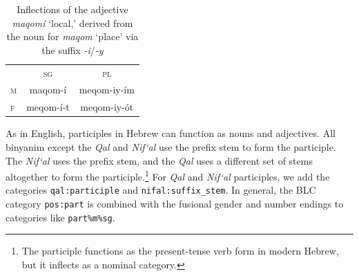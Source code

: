 {\begin{description}
\begin{table}[bt]
\centering
\small
\setlength{\extrarowheight}{8pt}
\begin{tabular}{lcc}
\toprule
& \textsc{sg} & \textsc{pl}  \\
\cmidrule(lr){2-3}
\textsc{m} & maqom-\'{i} &  meqom-iy-\'{i}m\\
\textsc{f} & meqom-\'{i}-t  & meqom-iy-\'{o}t  \\
\bottomrule
\end{tabular}
\label{tab:der-adjs}
\caption{Inflections of the adjective \textit{maqom\'{i}} `local,' derived from the noun for \textit{maqom} `place' via the suffix \textit{-i}/\textit{-y}}
\end{table}




\item[Participles.]
As in English, participles in Hebrew can function as nouns and adjectives.
All binyanim except the \textit{Qal} and \textit{Nif`al} use 
the prefix stem to form the participle. The \textit{Nif`al} uses the prefix stem, 
and the \textit{Qal} uses a different set of stems altogether to form the 
participle.\footnote{The participle functions as the present-tense verb form in modern Hebrew, but it inflects as a nominal category.}
For \textit{Qal} and \textit{Nif`al} participles, we add the categories \texttt{qal:participle} 
and \texttt{nifal:suffix\_stem}.  In general, the BLC category \texttt{pos:part} 
is combined with the fusional gender and number endings to categories like \texttt{part\%m\%sg}.


\end{description}}
